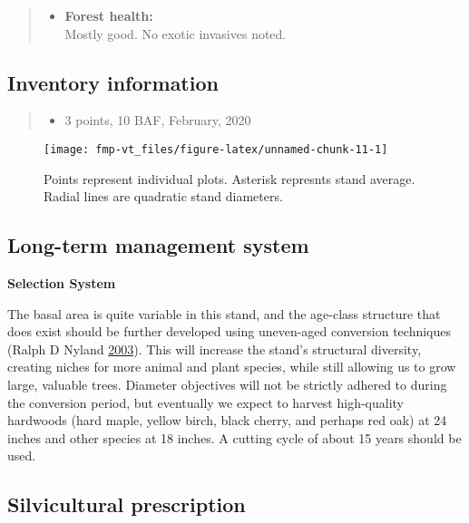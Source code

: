 \documentclass[]{tufte-handout}
\providecommand{\tightlist}{%
  \setlength{\itemsep}{0pt}\setlength{\parskip}{0pt}}
\begin{document}
\begin{quote}
\begin{itemize}
\tightlist
\item
  \textbf{Forest health:}\\
  \vspace{2pt} Mostly good. No exotic invasives noted.
\end{itemize}
\end{quote}

\subsection{Inventory information}\label{inventory-information-1}

\begin{quote}
\begin{itemize}
\tightlist
\item
  3 points, 10 BAF, February, 2020
\end{itemize}
\end{quote}

\begin{figure}
\texttt{[image: fmp-vt\_files/figure-latex/unnamed-chunk-11-1]} \caption[Points represent individual plots]{Points represent individual plots. Asterisk represnts stand average. Radial lines are quadratic stand diameters.}\label{fig:unnamed-chunk-11}
\end{figure}

\subsection{Long-term management
system}\label{long-term-management-system-1}

\textbf{Selection System}

The basal area is quite variable in this stand, and the age-class
structure that does exist should be further developed using uneven-aged
conversion techniques (Ralph D Nyland
\protect\hyperlink{ref-nyland_even-_2003}{2003}). This will increase the
stand's structural diversity, creating niches for more animal and plant
species, while still allowing us to grow large, valuable trees. Diameter
objectives will not be strictly adhered to during the conversion period,
but eventually we expect to harvest high-quality hardwoods (hard maple,
yellow birch, black cherry, and perhaps red oak) at 24 inches and other
species at 18 inches. A cutting cycle of about 15 years should be used.

\subsection{Silvicultural
prescription}\label{silvicultural-prescription-1}
\end{document}
